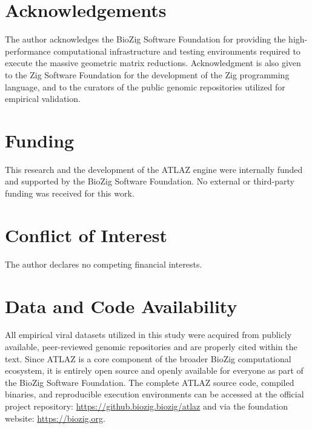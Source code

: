 \documentclass[modern, large]{oup-authoring-template}
\begin{document}






\section*{Acknowledgements}
The author acknowledges the BioZig Software Foundation for providing the high-performance computational infrastructure and testing environments required to execute the massive geometric matrix reductions. Acknowledgment is also given to the Zig Software Foundation for the development of the Zig programming language, and to the curators of the public genomic repositories utilized for empirical validation.

\section*{Funding}
This research and the development of the ATLAZ engine were internally funded and supported by the BioZig Software Foundation. No external or third-party funding was received for this work.

\section*{Conflict of Interest}
The author declares no competing financial interests. 

\section*{Data and Code Availability}
All empirical viral datasets utilized in this study were acquired from publicly available, peer-reviewed genomic repositories and are properly cited within the text. 
Since ATLAZ is a core component of the broader BioZig computational ecosystem, it is entirely open source and openly available for everyone as part of the BioZig Software Foundation. The complete ATLAZ source code, compiled binaries, and reproducible execution environments can be accessed at the official project repository: \url{https://github.biozig.biozig/atlaz} and via the foundation website: \url{https://biozig.org}.



\end{document}
